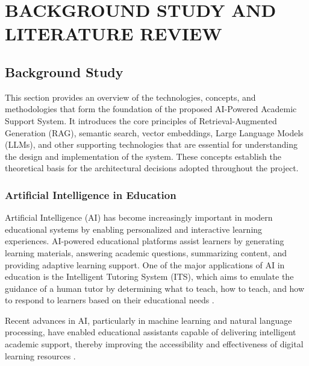 \chapter{BACKGROUND STUDY AND LITERATURE REVIEW}


\section{Background Study}

This section provides an overview of the technologies, concepts, and methodologies that form the foundation of the proposed AI-Powered Academic Support System. It introduces the core principles of Retrieval-Augmented Generation (RAG), semantic search, vector embeddings, Large Language Models (LLMs), and other supporting technologies that are essential for understanding the design and implementation of the system. These concepts establish the theoretical basis for the architectural decisions adopted throughout the project. \par

\subsection{Artificial Intelligence in Education}

Artificial Intelligence (AI) has become increasingly important in modern educational systems by enabling personalized and interactive learning experiences. AI-powered educational platforms assist learners by generating learning materials, answering academic questions, summarizing content, and providing adaptive learning support. One of the major applications of AI in education is the Intelligent Tutoring System (ITS), which aims to emulate the guidance of a human tutor by determining what to teach, how to teach, and how to respond to learners based on their educational needs \cite{1wang2023its,4gan2023llmeducation}. \par

Recent advances in AI, particularly in machine learning and natural language processing, have enabled educational assistants capable of delivering intelligent academic support, thereby improving the accessibility and effectiveness of digital learning resources \cite{1wang2023its,4gan2023llmeducation}. \par

